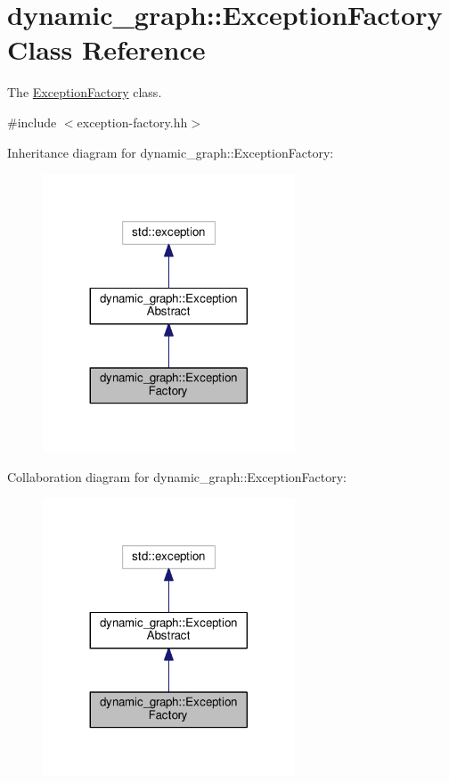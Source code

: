 \hypertarget{classdynamic__graph_1_1ExceptionFactory}{}\section{dynamic\+\_\+graph\+:\+:Exception\+Factory Class Reference}
\label{classdynamic__graph_1_1ExceptionFactory}


The \hyperlink{classdynamic__graph_1_1ExceptionFactory}{Exception\+Factory} class.  




{\ttfamily \#include $<$exception-\/factory.\+hh$>$}



Inheritance diagram for dynamic\+\_\+graph\+:\+:Exception\+Factory\+:\nopagebreak
\begin{figure}[H]
\begin{center}
\leavevmode
\includegraphics[width=212pt]{classdynamic__graph_1_1ExceptionFactory__inherit__graph}
\end{center}
\end{figure}


Collaboration diagram for dynamic\+\_\+graph\+:\+:Exception\+Factory\+:\nopagebreak
\begin{figure}[H]
\begin{center}
\leavevmode
\includegraphics[width=212pt]{classdynamic__graph_1_1ExceptionFactory__coll__graph}
\end{center}
\end{figure}

